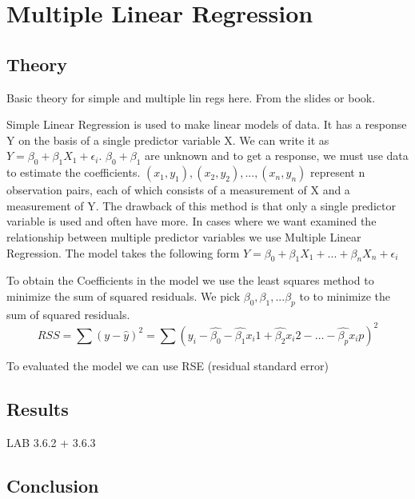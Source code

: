 \section{Multiple Linear Regression}\label{sc:multipleLinearRegression}

\subsection{Theory}

Basic theory for simple and multiple lin regs here. From the slides or book.

Simple Linear Regression is used to make linear models of data. It has a response Y on the basis of a single predictor variable X. We can write it as
$Y = \beta_0 + \beta_1 X_1 + \epsilon_i$.
$ \beta_0 + \beta_1 $ are unknown and to get a response, we must use data to estimate the coefficients.
$(x_1, y_1), (x_2, y_2), . . . , (x_n, y_n)$
represent n observation pairs, each of which consists of a measurement of X and a measurement of Y. The drawback of this method is that only a single predictor variable is used and often have more.
 In cases where we want examined the relationship between multiple predictor variables we use Multiple Linear Regression. The model takes the following form $Y = \beta_0 + \beta_1 X_1 + ... + \beta_n X_n + \epsilon_i$

To obtain the Coefficients in the model we use the least squares method to minimize the sum of squared residuals. We pick $\beta_0, \beta_1, ... \beta_p$ to to minimize the sum of squared residuals.
$$RSS = \sum (y - \hat{y})^2 = \sum( y_i - \hat{\beta_0} - \hat{\beta_1}x_\textit{i}1 + \hat{\beta_2}x_\textit{i}2 - \dots - \hat{\beta_p}x_\textit{i}p )^2$$

To evaluated the model we can use RSE (residual standard error)


\subsection{Results}

LAB 3.6.2 + 3.6.3

\subsection{Conclusion}